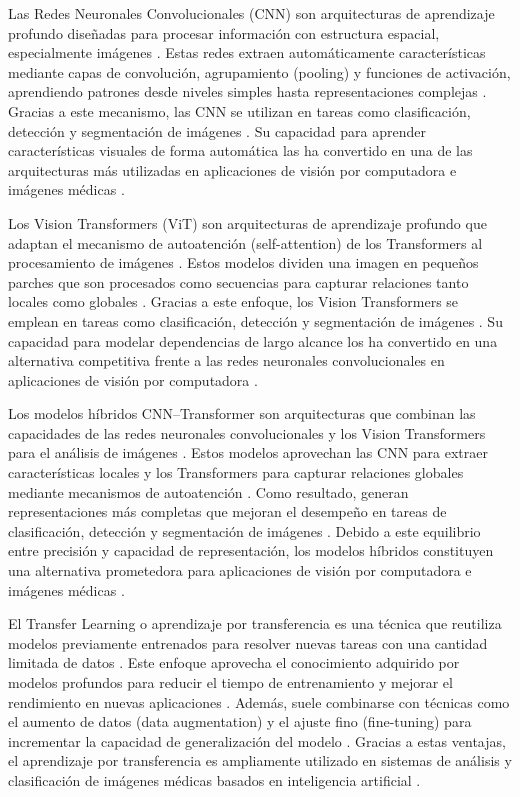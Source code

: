 Las Redes Neuronales Convolucionales (CNN) son arquitecturas de aprendizaje profundo diseñadas para procesar información con estructura espacial, especialmente imágenes \cite{ref36}. Estas redes extraen automáticamente características mediante capas de convolución, agrupamiento (pooling) y funciones de activación, aprendiendo patrones desde niveles simples hasta representaciones complejas \cite{ref36}. Gracias a este mecanismo, las CNN se utilizan en tareas como clasificación, detección y segmentación de imágenes \cite{ref36}. Su capacidad para aprender características visuales de forma automática las ha convertido en una de las arquitecturas más utilizadas en aplicaciones de visión por computadora e imágenes médicas \cite{ref36}.

Los Vision Transformers (ViT) son arquitecturas de aprendizaje profundo que adaptan el mecanismo de autoatención (self-attention) de los Transformers al procesamiento de imágenes \cite{ref37}. Estos modelos dividen una imagen en pequeños parches que son procesados como secuencias para capturar relaciones tanto locales como globales \cite{ref37}. Gracias a este enfoque, los Vision Transformers se emplean en tareas como clasificación, detección y segmentación de imágenes \cite{ref37}. Su capacidad para modelar dependencias de largo alcance los ha convertido en una alternativa competitiva frente a las redes neuronales convolucionales en aplicaciones de visión por computadora \cite{ref37}.

Los modelos híbridos CNN--Transformer son arquitecturas que combinan las capacidades de las redes neuronales convolucionales y los Vision Transformers para el análisis de imágenes \cite{ref38}. Estos modelos aprovechan las CNN para extraer características locales y los Transformers para capturar relaciones globales mediante mecanismos de autoatención \cite{ref38}. Como resultado, generan representaciones más completas que mejoran el desempeño en tareas de clasificación, detección y segmentación de imágenes \cite{ref38}. Debido a este equilibrio entre precisión y capacidad de representación, los modelos híbridos constituyen una alternativa prometedora para aplicaciones de visión por computadora e imágenes médicas \cite{ref38}.

El Transfer Learning o aprendizaje por transferencia es una técnica que reutiliza modelos previamente entrenados para resolver nuevas tareas con una cantidad limitada de datos \cite{ref39}. Este enfoque aprovecha el conocimiento adquirido por modelos profundos para reducir el tiempo de entrenamiento y mejorar el rendimiento en nuevas aplicaciones \cite{ref39}. Además, suele combinarse con técnicas como el aumento de datos (data augmentation) y el ajuste fino (fine-tuning) para incrementar la capacidad de generalización del modelo \cite{ref39}. Gracias a estas ventajas, el aprendizaje por transferencia es ampliamente utilizado en sistemas de análisis y clasificación de imágenes médicas basados en inteligencia artificial \cite{ref39}.

